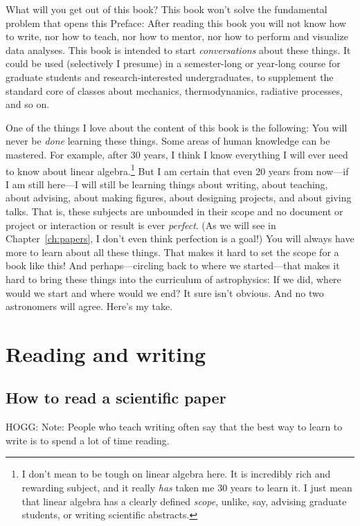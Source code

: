 \documentclass[letterpaper]{book}
\begin{document}
What will you get out of this book?
This book won't solve the fundamental problem that opens this Preface: 
After reading this book you will not know how to write, nor how to teach, nor how to mentor, nor how to perform and visualize data analyses.
This book is intended to start \emph{conversations} about these things.
It could be used (selectively I presume) in a semester-long or year-long course for graduate students and research-interested undergraduates, to supplement the standard core of classes about mechanics, thermodynamics, radiative processes, and so on.

One of the things I love about the content of this book is the following:
You will never be \emph{done} learning these things.
Some areas of human knowledge can be mastered.
For example, after 30 years, I think I know everything I will ever need to know about linear algebra.\footnote{I don't mean to be tough on linear algebra here. It is incredibly rich and rewarding subject, and it really \emph{has} taken me 30 years to learn it. I just mean that linear algebra has a clearly defined \emph{scope}, unlike, say, advising graduate students, or writing scientific abstracts.}
But I am certain that even 20 years from now---if I am still here---I will still be learning things about writing, about teaching, about advising, about making figures, about designing projects, and about giving talks.
That is, these subjects are unbounded in their scope and no document or project or interaction or result is ever \emph{perfect}.
(As we will see in Chapter~\ref{ch:papers}, I don't even think perfection is a goal!)
You will always have more to learn about all these things.
That makes it hard to set the scope for a book like this!
And perhaps---circling back to where we started---that makes it hard to bring these things into the curriculum of astrophysics: If we did, where would we start and where would we end?
It sure isn't obvious. And no two astronomers will agree. Here's my take.

\part{Reading and writing}%

\chapter{How to read a scientific paper}\label{ch:reading}

HOGG: Note: People who teach writing often say that the best way to learn to write is to spend a lot of time reading.
\end{document}
